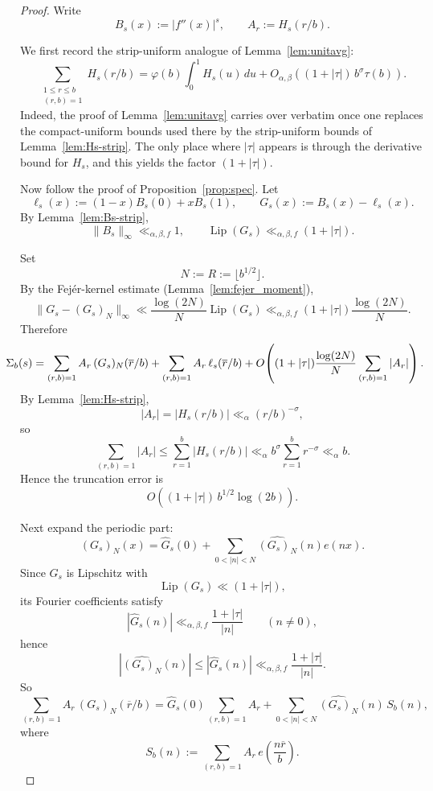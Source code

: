 \documentclass[10pt,a4paper]{amsart}
\begin{document}
\begin{proof}
Write
\[
B_s(x):=|f''(x)|^s,
\qquad
A_r:=H_s(r/b).
\]

We first record the strip-uniform analogue of Lemma~\ref{lem:unitavg}:
\begin{equation}
\label{eq:unitavg-strip}
\sum_{\substack{1\le r\le b\\(r,b)=1}} H_s(r/b)
=
\varphi(b)\int_0^1 H_s(u)\,du
+
O_{\alpha,\beta}\!\left((1+|\tau|)\,b^\sigma \tau(b)\right).
\end{equation}
Indeed, the proof of Lemma~\ref{lem:unitavg} carries over verbatim once one replaces the
compact-uniform bounds used there by the strip-uniform bounds of Lemma~\ref{lem:Hs-strip}.
The only place where \(|\tau|\) appears is through the derivative bound for \(H_s\), and this yields
the factor \((1+|\tau|)\).

Now follow the proof of Proposition~\ref{prop:spec}. Let
\[
\ell_s(x):=(1-x)B_s(0)+xB_s(1),
\qquad
G_s(x):=B_s(x)-\ell_s(x).
\]
By Lemma~\ref{lem:Bs-strip},
\[
\|B_s\|_\infty\ll_{\alpha,\beta,f}1,
\qquad
\operatorname{Lip}(G_s)\ll_{\alpha,\beta,f}(1+|\tau|).
\]

Set
\[
N:=R:=\lfloor b^{1/2}\rfloor.
\]
By the Fej\'er-kernel estimate (Lemma~\ref{lem:fejer_moment}),
\[
\|G_s-(G_s)_N\|_\infty
\ll
\frac{\log(2N)}{N}\operatorname{Lip}(G_s)
\ll_{\alpha,\beta,f}
(1+|\tau|)\frac{\log(2N)}{N}.
\]
Therefore
\[\mkern-25mu
\Sigma_b(s)
=
\sum_{(r,b)=1}A_r\,(G_s)_N(\overline r/b)
+
\sum_{(r,b)=1}A_r\,\ell_s(\overline r/b)
+
O\!\left((1+|\tau|)\frac{\log(2N)}{N}\sum_{(r,b)=1}|A_r|\right).
\]
By Lemma~\ref{lem:Hs-strip},
\[
|A_r|=|H_s(r/b)|\ll_\alpha (r/b)^{-\sigma},
\]
so
\[
\sum_{(r,b)=1}|A_r|
\le
\sum_{r=1}^b |H_s(r/b)|
\ll_\alpha
b^\sigma\sum_{r=1}^b r^{-\sigma}
\ll_\alpha b.
\]
Hence the truncation error is
\begin{equation}
\label{eq:trunc-strip}
O\!\left((1+|\tau|)\,b^{1/2}\log(2b)\right).
\end{equation}

Next expand the periodic part:
\[
(G_s)_N(x)=\widehat G_s(0)+\sum_{0<|n|<N}\widehat{(G_s)_N}(n)e(nx).
\]
Since \(G_s\) is Lipschitz with
\[
\operatorname{Lip}(G_s)\ll (1+|\tau|),
\]
its Fourier coefficients satisfy
\[
|\widehat G_s(n)|\ll_{\alpha,\beta,f}\frac{1+|\tau|}{|n|}
\qquad (n\neq0),
\]
hence
\[
|\widehat{(G_s)_N}(n)|\le |\widehat G_s(n)|
\ll_{\alpha,\beta,f}\frac{1+|\tau|}{|n|}.
\]
So
\[
\sum_{(r,b)=1}A_r\,(G_s)_N(\overline r/b)
=
\widehat G_s(0)\sum_{(r,b)=1}A_r
+
\sum_{0<|n|<N}\widehat{(G_s)_N}(n)\,S_b(n),
\]
where
\[
S_b(n):=\sum_{(r,b)=1}A_r\,e\!\left(\frac{n\overline r}{b}\right).
\]


\end{proof}
\end{document}
